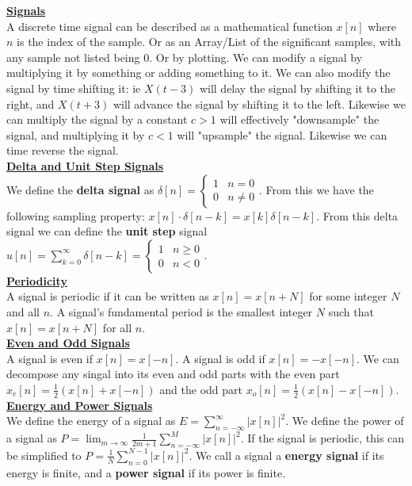 \documentclass[10pt]{article}
\author{Lawrence Liu}
\begin{document}
\underline{\textbf{Signals}}\\
A discrete time signal can be described as a mathematical function $x[n]$ where $n$ is the index of the sample.
Or as an Array/List of the significant samples, with any sample not listed being 0. 
Or by plotting. We can modify a signal by multiplying it by something or adding something to it. We can also
modify the signal by time shifting it: ie $X(t-3)$ will delay the signal by shifting it to the right, and $X(t+3)$ will
advance the signal by shifting it to the left. Likewise we can multiply the signal by a constant $c>1$ will effectively
"downsample" the signal, and multiplying it by $c<1$ will "upsample" the signal. Likewise we can time reverse the signal. \\
\underline{\textbf{Delta and Unit Step Signals}}\\
We define the \textbf{delta signal} as $\boxed{\delta[n]=\begin{cases}1 & n=0\\0 & n\neq 0\end{cases}}$. From this we have the following sampling
property: $\boxed{x[n]\cdot\delta[n-k]=x[k]\delta[n-k]}$. From this delta signal we can define the \textbf{unit step} signal 
$\boxed{u[n]=\sum_{k=0}^{\infty}\delta[n-k]=\begin{cases}1 & n\geq 0\\0 & n<0\end{cases}}$.\\
\underline{\textbf{Periodicity}}\\
A signal is periodic if it can be written as $x[n]=x[n+N]$ for some integer $N$ and all $n$. A signal's fundamental period 
is the smallest integer $N$ such that $x[n]=x[n+N]$ for all $n$.\\
\underline{\textbf{Even and Odd Signals}}\\
A signal is even if $x[n]=x[-n]$. A signal is odd if $x[n]=-x[-n]$. We can decompose any singal into its even and odd parts
with the even part $x_e[n]=\frac{1}{2}(x[n]+x[-n])$ and the odd part $x_o[n]=\frac{1}{2}(x[n]-x[-n])$.\\
\underline{\textbf{Energy and Power Signals}}\\
We define the energy of a signal as $\boxed{E=\sum_{n=-\infty}^{\infty}|x[n]|^2}$. We define the power of a signal as $
\boxed{P=\lim_{m\to\infty}\frac{1}{2m+1}\sum_{n=-\infty}^{M}|x[n]|^2}$. If the signal is periodic, this can be 
simplified to $\boxed{P=\frac{1}{N}\sum_{n=0}^{N-1}|x[n]|^2}$. We call a signal a \textbf{energy signal} if its energy is finite, and a \textbf{power signal} if its power is finite.
\end{document}

